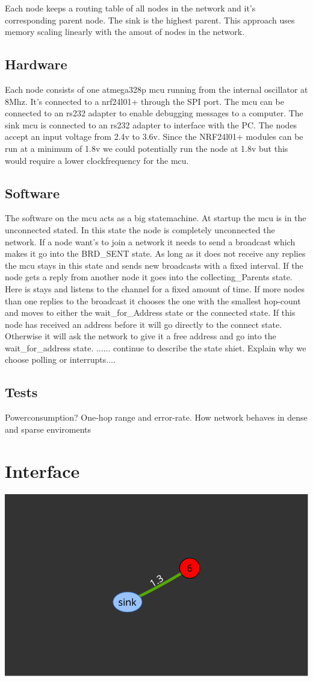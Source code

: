 \documentclass[a4paper,11pt]{article}
\begin{document}
Each node keeps a routing table of all nodes in the network and it's
corresponding parent node. The sink is the highest parent. This
approach uses memory scaling linearly with the amout of nodes in the
network.

\subsection{Hardware}
 Each node consists of one atmega328p mcu running from the internal
oscillator at 8Mhz. It's connected to a nrf24l01+ through the SPI
port. The mcu can be connected to an rs232 adapter to enable debugging
messages to a computer. The sink mcu is connected to an rs232 adapter
to interface with the PC. The nodes accept an input voltage from 2.4v
to 3.6v. Since the NRF24l01+ modules can be run at a minimum of 1.8v
we could potentially run the node at 1.8v but this would require a
lower clockfrequency for the mcu.



\subsection{Software}
 The software on the mcu acts as a big statemachine. At startup the
mcu is in the unconnected stated. In this state the node is completely
unconnected the network. If a node want's to join a network it needs
to send a broadcast which makes it go into the BRD\_SENT state. As
long as it does not receive any replies the mcu stays in this state
and sends new broadcasts with a fixed interval.  If the node gets a
reply from another node it goes into the collecting\_Parents
state. Here is stays and listens to the channel for a fixed amount of
time. If more nodes than one replies to the broadcast it chooses the
one with the smallest hop-count and moves to either the
wait\_for\_Address state or the connected state.  If this node has
received an address before it will go directly to the connect
state. Otherwise it will ask the network to give it a free address and
go into the wait\_for\_address state.  ...... continue to describe the
state shiet. Explain why we choose polling or interrupts....


\subsection{Tests}
Powerconsumption?
One-hop range and error-rate.
How network behaves in dense and sparse enviroments
 

\section{Interface}
\begin{center}
\includegraphics[width=.5\textwidth]{map}
\end{center}
\end{document}
